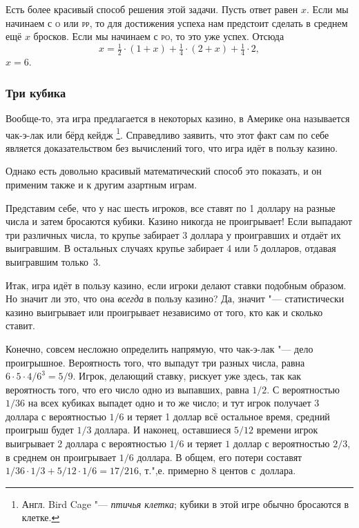 \documentclass[twoside]{book}
\begin{document}
Есть более красивый способ решения этой задачи.
Пусть ответ равен $x$.
Если мы начинаем с \textsc{о} или \textsc{рр}, то для достижения успеха нам предстоит сделать в среднем ещё $x$ бросков.
Если мы начинаем с \textsc{ро}, то это уже успех.
Отсюда 
\[x=\tfrac12 \cdot(1+x)+\tfrac14 \cdot(2+x)+\tfrac14 \cdot2,\]
 $x=6$.

\subsubsection*{Три кубика}%

Вообще-то, эта игра предлагается в некоторых казино, в Америке она называется чак-э-лак или бёрд кейдж%
\footnote{Англ. Bird Cage "--- \emph{птичья клетка}; кубики в этой игре обычно бросаются в клетке.}. 
Справедливо заявить, что этот факт сам по себе является доказательством без вычислений того, что игра идёт в пользу казино.

Однако есть довольно красивый математический способ это показать, и он применим также и к другим азартным играм.

\medskip

Представим себе, что у нас шесть игроков, все ставят по 1 доллару на разные числа и затем бросаются кубики.
Казино никогда не проигрывает!
Если выпадают три различных числа, то крупье забирает 3 доллара у проигравших и отдаёт их выигравшим.
В остальных случаях крупье забирает 4 или 5 долларов, отдавая выигравшим только~3.
\heart

Итак, игра идёт в пользу казино, если игроки делают ставки подобным образом.
Но значит ли это, что она \emph{всегда} в пользу казино?
Да, значит "--- статистически казино выигрывает или проигрывает независимо от того, кто как и сколько ставит.

Конечно, совсем несложно определить напрямую, что чак-э-лак "--- дело проигрышное.
Вероятность того, что выпадут три разных числа, равна $6\cdot 5\cdot 4/6^3=5/9$.
Игрок, делающий ставку, рискует уже здесь, так как вероятность того, что его число одно из выпавших, равна $1/2$.
С вероятностью $1/36$ на всех кубиках выпадет одно и то же число;
и тут игрок получает $3$ доллара с вероятностью $1/6$ и теряет 1 доллар всё остальное время, средний проигрыш будет $1/3$ доллара.
И наконец, оставшиеся $5/12$ времени игрок выигрывает $2$ доллара с вероятностью $1/6$ и теряет $1$ доллар с вероятностью $2/3$, в среднем он проигрывает $1/6$ доллара.
В общем, его потери составят $1/36 \cdot 1/3 + 5/12 \cdot 1/6 = 17/216$, т.",е. примерно $8$ центов с~доллара.
\end{document}
